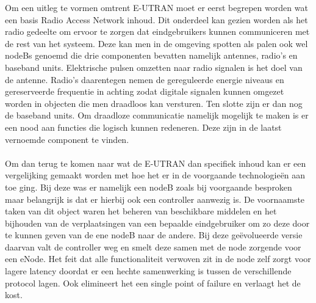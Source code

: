 Om een uitleg te vormen omtrent E-UTRAN moet er eerst begrepen worden wat een basis Radio Access Network inhoud. Dit onderdeel kan gezien worden als het radio gedeelte om ervoor te zorgen dat eindgebruikers kunnen communiceren met de rest van het systeem. Deze kan men in de omgeving spotten als palen ook wel nodeBs genoemd die drie componenten bevatten namelijk antennes, radio's en baseband units. Elektrische pulsen omzetten naar radio signalen is het doel van de antenne. Radio's daarentegen nemen de gereguleerde energie niveaus en gereserveerde frequentie in achting zodat digitale signalen kunnen omgezet worden in objecten die men draadloos kan versturen. Ten slotte zijn er dan nog de baseband units. Om draadloze communicatie namelijk mogelijk te maken is er een nood aan functies die logisch kunnen redeneren. Deze zijn in de laatst vernoemde component te vinden. \autocite{Jones2021} \\ \\
Om dan terug te komen naar wat de E-UTRAN dan specifiek inhoud kan er een vergelijking gemaakt worden met hoe het er in de voorgaande technologieën aan toe ging. Bij deze was er namelijk een nodeB zoals bij voorgaande besproken maar belangrijk is dat er hierbij ook een controller aanwezig is. De voornaamste taken van dit object waren het beheren van beschikbare middelen en het bijhouden van de verplaatsingen van een bepaalde eindgebruiker om zo deze door te kunnen geven van de ene nodeB naar de andere. Bij deze geëvolueerde versie daarvan valt de controller weg en smelt deze samen met de node zorgende voor een eNode. \autocite{Ghayas2019} Het feit dat alle functionaliteit verwoven zit in de node zelf zorgt voor lagere latency doordat er een hechte samenwerking is tussen de verschillende protocol lagen. Ook elimineert het een single point of failure en verlaagt het de kost. \autocite{Palat2011} \\

